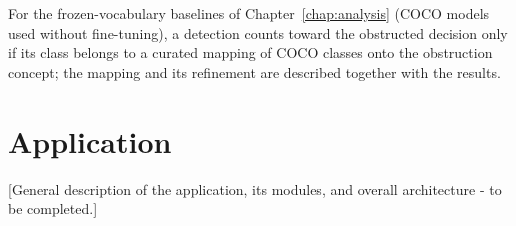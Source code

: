 For the frozen-vocabulary baselines of Chapter~\ref{chap:analysis} (COCO
models used without fine-tuning), a detection counts toward the obstructed
decision only if its class belongs to a curated mapping of COCO classes onto
the obstruction concept; the mapping and its refinement are described together
with the results.

\section{Application}

[General description of the application, its modules, and overall architecture -
to be completed.]
